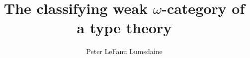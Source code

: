 \documentclass{amsart}
\begin{document}

\title{The classifying weak $\omega$-category of a type theory}

\author[P. LeF. Lumsdaine]{Peter LeFanu Lumsdaine}

\maketitle
\tableofcontents







\clearpage




\end{document}
